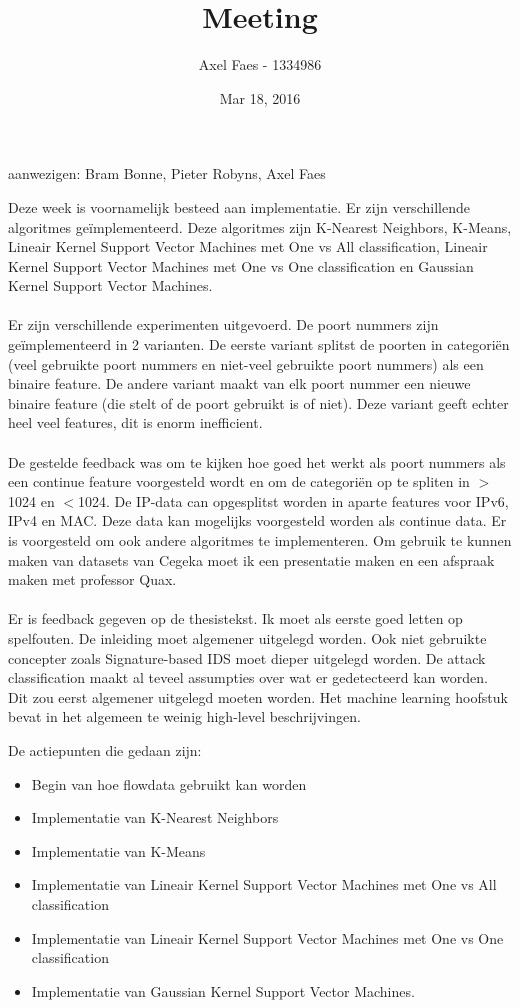 \documentclass[notitlepage]{article}
\title{Meeting}
\author{Axel Faes - 1334986}
\date{Mar 18, 2016}
\begin{document}
\maketitle

aanwezigen: Bram Bonne, Pieter Robyns, Axel Faes

Deze week is voornamelijk besteed aan implementatie. Er zijn verschillende algoritmes ge\"implementeerd. Deze algoritmes zijn K-Nearest Neighbors, K-Means, Lineair Kernel Support Vector Machines met One vs All classification, Lineair Kernel Support Vector Machines met One vs One classification en Gaussian Kernel Support Vector Machines. \\
\\
Er zijn verschillende experimenten uitgevoerd. De poort nummers zijn ge\"implementeerd in 2 varianten. De eerste variant splitst de poorten in categori\"en (veel gebruikte poort nummers en niet-veel gebruikte poort nummers) als een binaire feature. De andere variant maakt van elk poort nummer een nieuwe binaire feature (die stelt of de poort gebruikt is of niet). Deze variant geeft echter heel veel features, dit is enorm inefficient. \\
\\
De gestelde feedback was om te kijken hoe goed het werkt als poort nummers als een continue feature voorgesteld wordt en om de categori\"en op te spliten in $>$1024 en $<$1024. De IP-data can opgesplitst worden in aparte features voor IPv6, IPv4 en MAC. Deze data kan mogelijks voorgesteld worden als continue data. Er is voorgesteld om ook andere algoritmes te implementeren. Om gebruik te kunnen maken van datasets van Cegeka moet ik een presentatie maken en een afspraak maken met professor Quax. \\
\\
Er is feedback gegeven op de thesistekst. Ik moet als eerste goed letten op spelfouten. De inleiding moet algemener uitgelegd worden. Ook niet gebruikte concepter zoals Signature-based IDS moet dieper uitgelegd worden. De attack classification maakt al teveel assumpties over wat er gedetecteerd kan worden. Dit zou eerst algemener uitgelegd moeten worden. Het machine learning hoofstuk bevat in het algemeen te weinig high-level beschrijvingen. 

De actiepunten die gedaan zijn:
\begin{itemize}  
		\item Begin van hoe flowdata gebruikt kan worden
        \item Implementatie van K-Nearest Neighbors
        \item Implementatie van K-Means
        \item Implementatie van Lineair Kernel Support Vector Machines met One vs All classification
        \item Implementatie van Lineair Kernel Support Vector Machines met One vs One classification
        \item Implementatie van Gaussian Kernel Support Vector Machines.
\end{itemize}
\end{document}
